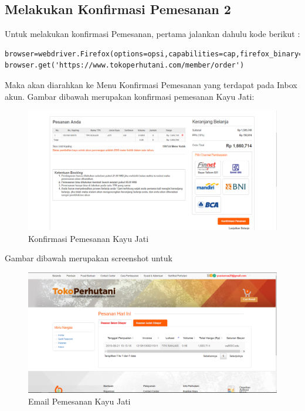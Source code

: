 \newpage
\subsection {Melakukan Konfirmasi Pemesanan 2}
Untuk melakukan konfirmasi Pemesanan, pertama jalankan dahulu kode berikut :
\begin{verbatim}
browser=webdriver.Firefox(options=opsi,capabilities=cap,firefox_binary=binary)
browser.get('https://www.tokoperhutani.com/member/order')
\end{verbatim}

Maka akan diarahkan ke Menu Konfirmasi Pemesanan yang terdapat pada Inbox akun.
Gambar dibawah merupakan konfirmasi pemesanan Kayu Jati:
\begin{figure}[h]
	\centering
	\includegraphics[scale=0.25]{figures/T6_1}
	\caption{Konfirmasi Pemesanan Kayu Jati}
\end{figure}

Gambar dibawah merupakan screenshot untuk
\begin{figure}[h]
	\centering
	\includegraphics[scale=0.25]{figures/T6_2}
	\caption{Email Pemesanan Kayu Jati}
\end{figure}

\newpage
